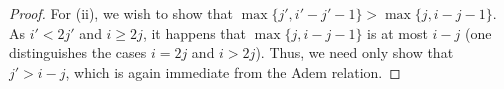 \documentclass[10pt]{article}
\makeatletter
\newcommand{\produces}[3]{{#1}{#3}{#2}}
\renewcommand{\Q}{Q}
\newcommand{\minDim}{m}
\newcommand{\minDimP}{\overline{m}}
\renewcommand{\produces}[3]{
{
\def\labelstyle{\scriptstyle}
\xymatrix@C=2em@1{
{#1}
\ar@{-}[r]|-{{\,#3\,}}
&%
{#2}%
}}}
\makeatother
\begin{document}
\begin{SteenrodAlgebrasAndTheirKoszulDuals}
\begin{proof}
For (ii), we wish to show that $\max\{j',i'-j'-1\}>\max\{j,i-j-1\}$. As $i'< 2j'$ and $i\geq2j$, it happens that $\max\{j,i-j-1\}$ is at most $i-j$ (one distinguishes the cases $i=2j$ and $i>2j$). Thus, we need only show that $j'>i-j$, which is again immediate from the Adem relation.
\end{proof}
%
%



\end{SteenrodAlgebrasAndTheirKoszulDuals}
\end{document}
